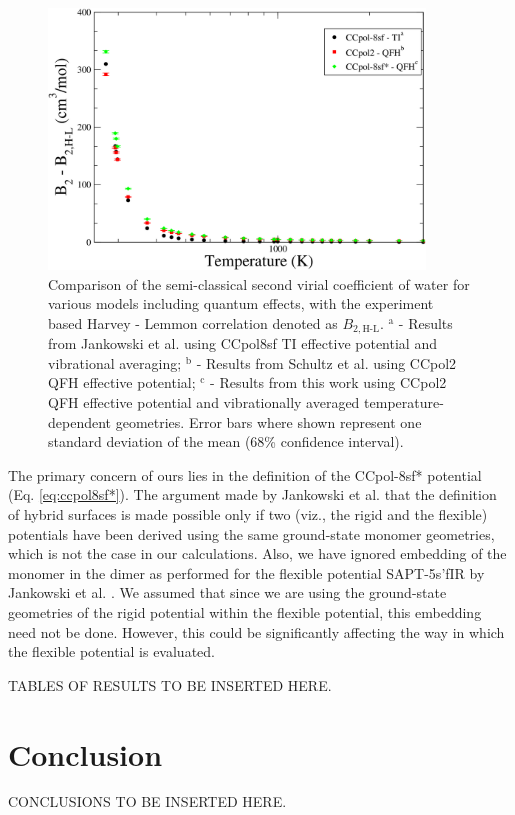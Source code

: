         \begin{figure}[!htbp]
            \centering
            \includegraphics[width=10cm,keepaspectratio]{Chapter-7/Figures/B2SCAll.png}
            \caption{Comparison of the semi-classical second virial coefficient of water for various models including quantum effects, with the experiment based Harvey - Lemmon correlation \cite{Harvey2004} denoted as $B_{2,\text{H-L}}$. $^\text{a}$ - Results from Jankowski et al. \cite{Jankowski2015} using CCpol8sf TI effective potential and vibrational averaging; $^\text{b}$ - Results from Schultz et al. \cite{Schultz2015} using CCpol2 QFH effective potential; $^\text{c}$ - Results from this work using CCpol2 QFH effective potential and vibrationally averaged temperature-dependent geometries. Error bars where shown represent one standard deviation of the mean (68\% confidence interval).}
            \label{fig:B2SC-comparison}
        \end{figure}

        The primary concern of ours lies in the definition of the CCpol-8sf* potential (Eq. \eqref{eq:ccpol8sf*}). The argument made by Jankowski et al. \cite{Jankowski2015} that the definition of hybrid surfaces is made possible only if two (viz., the rigid and the flexible) potentials have been derived using the same ground-state monomer geometries, which is not the case in our calculations. Also, we have ignored embedding of the monomer in the dimer as performed for the flexible potential SAPT-5s'fIR by Jankowski et al. \cite{Jankowski2015}. We assumed that since we are using the ground-state geometries of the rigid potential within the flexible potential, this embedding need not be done. However, this could be significantly affecting the way in which the flexible potential is evaluated.

        TABLES OF RESULTS TO BE INSERTED HERE.
    \section{Conclusion}
    \label{chap7-sec:conclusion}
        CONCLUSIONS TO BE INSERTED HERE.

